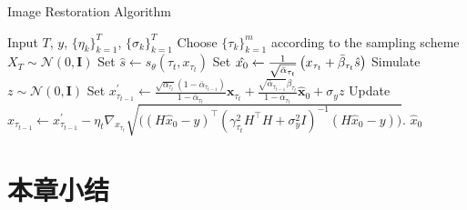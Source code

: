 \begin{breakablealgorithm}
\caption{Image Restoration Algorithm }
\label{ours algorithm }
    \begin{algorithmic}[1]
   \REQUIRE Input $T$, $y$, $\{\eta_k\}_{k=1}^{T}$, $\{\sigma_k\}_{k=1}^{T}$
   \REQUIRE Choose $\{\tau_k\}_{k=1}^{m}$ according to the sampling scheme
   \STATE $X_{T}\sim \mathcal{N}(0,\boldsymbol{I})$
   \STATE Set $\hat{s}\xleftarrow{} s_{\theta}(\tau_t,x_{\tau_t})$
   \STATE Set $\hat{x_0} \xleftarrow{} \frac{1}{\sqrt{\Bar{\alpha}_{\tau_t}}}\left(x_{\tau_t}+\Bar{\beta}_{\tau_t}\hat{s}\right)$
   \STATE Simulate $z\sim \mathcal{N}(0,\boldsymbol{I})$
   \STATE Set $x^{\prime}_{\tau_{t-1}}\xleftarrow{} \frac{\sqrt{\alpha_{\tau_t}}\left(1-\bar{\alpha}_{\tau_{t-1}}\right)}{1-\bar{\alpha}_{\tau_t}} \boldsymbol{x}_{\tau_t}+\frac{\sqrt{\bar{\alpha}_{\tau_{t-1}}} \beta_{\tau_t}}{1-\bar{\alpha}_{\tau_t}} \hat{\boldsymbol{x}}_0+\sigma_{y} {z} $
   \STATE Update $x_{\tau_{t-1}}\xleftarrow{} {x}_{\tau_{t-1}}^{\prime}-\eta_t \nabla_{x_{\tau_t}}\sqrt{((H\hat{x}_0-y)^{\top}\left(\gamma_{\tau_t}^2 H^{\top}H + \sigma_y^2 I\right)^{-1}(H\hat{x}_0-y)\bigg)}. $
   \ENDFOR
   \RETURN $\hat{x}_0$ 
    \end{algorithmic}
\end{breakablealgorithm}





\section{本章小结}
